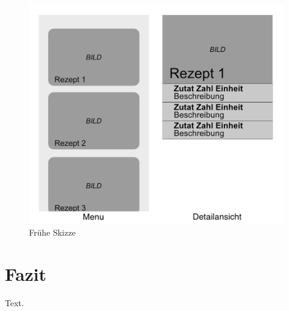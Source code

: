\documentclass[12pt]{article}
\begin{document}
\begin{figure}
    \includegraphics[width=\linewidth]{pictures/Sketch.png}
    \caption{Frühe Skizze}
    \label{fig:earlySketch}
\end{figure}

\section{Fazit}
Text.


\renewcommand\refname{Bibliografie}

\end{document}

